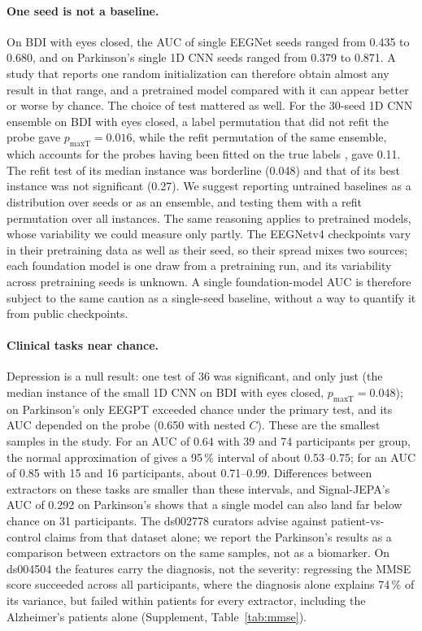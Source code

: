 \documentclass[11pt]{article}
\begin{document}
\paragraph{One seed is not a baseline.} On BDI with eyes closed, the AUC of single EEGNet seeds
ranged from 0.435 to 0.680, and on Parkinson's single 1D CNN seeds ranged from 0.379 to 0.871. A
study that reports one random initialization can therefore obtain almost any result in that range,
and a pretrained model compared with it can appear better or worse by chance. The choice of test
mattered as well. For the 30-seed 1D CNN ensemble on BDI with eyes closed, a label permutation that
did not refit the probe gave $p_\text{maxT} = 0.016$, while the refit permutation of the same
ensemble, which accounts for the probes having been fitted on the true labels \citep{ojala2010},
gave 0.11. The refit test of its median instance was borderline (0.048) and that of its best
instance was not significant (0.27). We suggest reporting untrained baselines as a distribution over seeds or as an ensemble, and
testing them with a refit permutation over all instances. The same reasoning applies to pretrained
models, whose variability we could measure only partly. The EEGNetv4 checkpoints vary in their
pretraining data as well as their seed, so their spread mixes two sources; each foundation model is
one draw from a pretraining run, and its variability across pretraining seeds is unknown. A single
foundation-model AUC is therefore subject to the same caution as a single-seed baseline, without a
way to quantify it from public checkpoints.

\paragraph{Clinical tasks near chance.} Depression is a null result: one test of 36 was
significant, and only just (the median instance of the small 1D CNN on BDI with eyes closed, $p_\text{maxT} = 0.048$); on
Parkinson's only EEGPT exceeded chance under the primary test, and its AUC depended on the probe
(0.650 with nested $C$). These are the smallest samples in the study. For
an AUC of 0.64 with 39 and 74 participants per group, the normal approximation of
\citet{hanley1982} gives a 95\,\% interval of about 0.53--0.75; for an AUC of 0.85 with 15 and 16
participants, about 0.71--0.99. Differences between extractors on these tasks are smaller than these
intervals, and Signal-JEPA's AUC of 0.292 on Parkinson's shows that a single model can also land far
below chance on 31 participants. The ds002778 curators advise against patient-vs-control claims from
that dataset alone; we report the Parkinson's results as a comparison between extractors on the same
samples, not as a biomarker.
On ds004504 the features carry the diagnosis, not the severity: regressing the MMSE score
succeeded across all participants, where the diagnosis alone explains 74\,\% of its variance, but
failed within patients for every extractor, including the Alzheimer's patients alone
(Supplement, Table~\ref{tab:mmse}).
\end{document}
